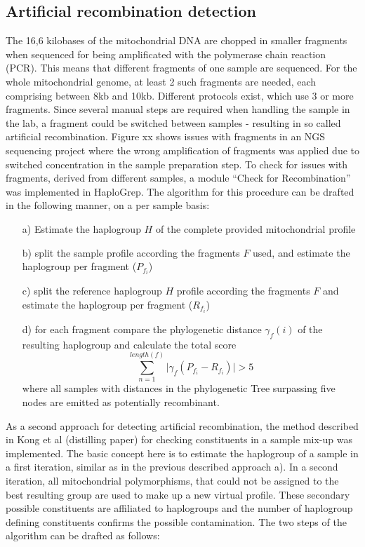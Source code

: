 \subsection{Artificial recombination detection}
The 16,6 kilobases of the mitochondrial DNA are chopped in smaller fragments when sequenced for being amplificated with the polymerase chain reaction (PCR). This means that different fragments of one sample are sequenced. For the whole mitochondrial genome, at least 2 such fragments are needed, each comprising between 8kb and 10kb. Different protocols exist, which use 3 or more fragments. Since several manual steps are required when handling the sample in the lab, a fragment could be switched between samples - resulting in so called artificial recombination. Figure xx shows issues with fragments in an NGS sequencing project where the wrong amplification of fragments was applied due to switched concentration in the sample preparation step.
To check for issues with fragments, derived from different samples, a module "`Check for Recombination"' was implemented in HaploGrep. The algorithm for this procedure can be drafted in the following manner, on a per sample basis:
\begin{itemize}
	\item[a)] Estimate the haplogroup $H$ of the complete provided mitochondrial profile 
	\item[b)] split the sample profile according the fragments $F$ used, and estimate the haplogroup per fragment ($P_{f_i}$)
	\item[c)] split the reference haplogroup $H$ profile according the fragments $F$ and estimate the haplogroup per fragment ($R_{f_i}$)
	\item[d)] for each fragment compare the phylogenetic distance $\gamma_f(i)$ of the resulting haplogroup and calculate the total score $$\sum_{n=1}^{length(f)} |{\gamma_f(P_{f_i} - R_{f_i})| > 5}$$ where all samples with distances in the phylogenetic Tree surpassing five nodes are emitted as potentially recombinant.
\end{itemize}
As a second approach for detecting artificial recombination, the method described in Kong et al (distilling paper) for checking constituents in a sample mix-up was implemented. The basic concept here is to estimate the haplogroup of a sample in a first iteration, similar as in the previous described approach a). In a second iteration, all mitochondrial polymorphisms, that could not be assigned to the best resulting group are used to make up a new virtual profile. These secondary possible constituents are affiliated to haplogroups and the number of haplogroup defining constituents confirms the possible contamination. The two steps of the algorithm can be drafted as follows:
